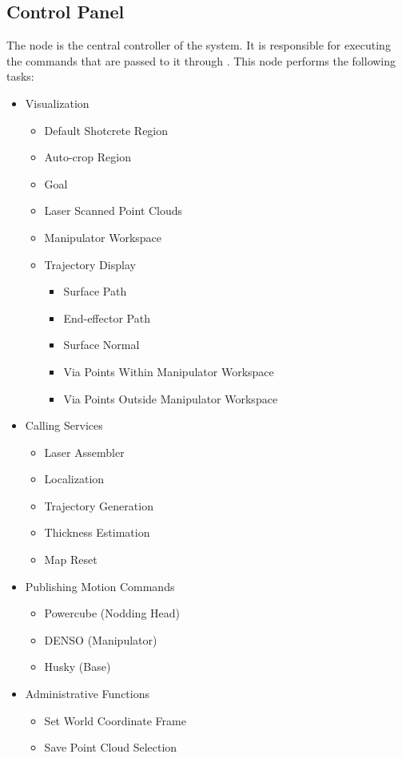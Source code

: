 \subsection{Control Panel}
The  node is the central controller of the system. It is responsible for executing the commands that are passed to it through . This node performs the following tasks:
\begin{itemize}
\item Visualization
\begin{itemize}
\item Default Shotcrete Region
\item Auto-crop Region
\item {} Goal
\item Laser Scanned Point Clouds
\item Manipulator Workspace
\item Trajectory Display
\begin{itemize}
\item Surface Path
\item End-effector Path
\item Surface Normal
\item Via Points Within Manipulator Workspace
\item Via Points Outside Manipulator Workspace
\end{itemize}
\end{itemize}
\item Calling Services
\begin{itemize}
\item Laser Assembler
\item Localization
\item Trajectory Generation
\item Thickness Estimation
\item Map Reset
\end{itemize}
\item Publishing Motion Commands
\begin{itemize}
\item Powercube (Nodding Head)
\item DENSO (Manipulator)
\item Husky (Base)
\end{itemize}
\item Administrative Functions
\begin{itemize}
\item Set World Coordinate Frame
\item Save Point Cloud Selection

\end{itemize}
\end{itemize}
